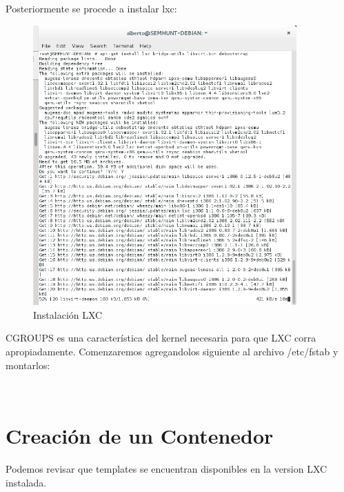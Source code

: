 \documentclass[1pt]{article} %
\begin{document}
\newpage
\setlength{\parindent}{0em} 									%
Posteriormente se procede a instalar lxc:

\begin{center}
\end{center}
\begin{figure}[!ht]
	\begin{center}
		\includegraphics[width=0.9\textwidth]{3.png}
		\caption{Instalación LXC}
	\end{center}
\end{figure}
CGROUPS es una característica del kernel necesaria para que LXC corra apropiadamente. Comenzaremos agregandolos siguiente al archivo /etc/fstab y montarlos:

\begin{center}
	\\
\end{center}

\newpage
\section{Creación de un Contenedor}

Podemos revisar que templates se encuentran disponibles en la version LXC instalada.
\end{document}
